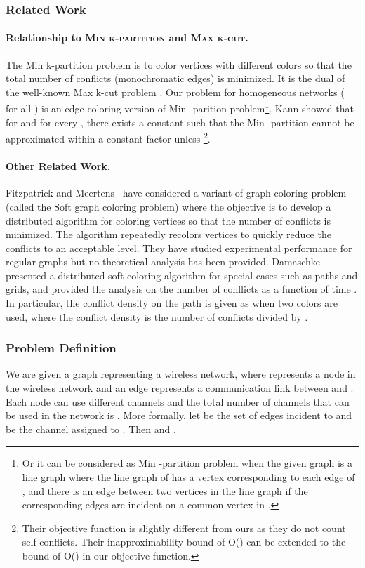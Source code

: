 \documentclass[titlepage, 11pt]{article}
\begin{document}
\subsubsection{Related Work} 
\paragraph{Relationship to \textsc{Min k-partition} and \textsc{Max k-cut}.} 
The {\sc Min k-partition} problem is 
to color vertices with  different colors
so that the total number of conflicts (monochromatic edges) is minimized.
It is the dual of the well-known {\sc Max k-cut} problem \cite{kann:istcs}.
Our problem for homogeneous networks ( for all ) 
is an edge coloring version of {\sc Min -parition} problem\footnote{
Or it can be considered as {\sc Min -partition} problem  
when the given graph is a line graph where 
the line graph of  has a vertex corresponding to
each edge of , and there is an edge between two vertices
in the line graph if the corresponding edges
are incident on a common vertex in .}.
Kann \cite{kann:istcs} showed that for  and for every ,
there exists a constant  such that the {\sc Min -partition} 
cannot be approximated within a constant factor
unless 
\footnote{Their objective function is
slightly different from ours as they do not count self-conflicts. Their inapproximability bound 
of O() can be extended to the bound of O() in our objective function.}. 


\paragraph{Other Related Work.}
Fitzpatrick and Meertens~\cite{softexp} have considered a variant of 
graph coloring problem (called the {\sc Soft graph coloring} problem)
where the objective is to develop a distributed  algorithm for coloring
vertices so that the number of conflicts is minimized.
The algorithm repeatedly recolors vertices to quickly reduce 
the conflicts to an acceptable level.
They have studied experimental performance for regular graphs 
but no theoretical analysis has been provided.   
Damaschke~\cite{softpath} presented a distributed soft coloring algorithm
for special cases such as paths and grids, 
and provided the analysis on the number of conflicts as a function of time . 
In particular, the conflict density on the path is given as  
when two colors are used,
where the conflict density is the number of conflicts divided by .

\subsubsection{Problem Definition}
We are given a graph  representing a wireless network, where  represents a node in the wireless network and an edge  represents a communication link
between  and .
Each node  can use  different channels and the total number
of channels that can be used in the network is . 
More formally, let  be the set of edges incident to  and  be the channel assigned to . 
Then  and 
.
\iffalse when we color edges, we can use at most  colors and for each node ,
edges in  can use at most  different colors
(We use {\em channel} and {\em color} interchangeably).
\fi
\end{document}
